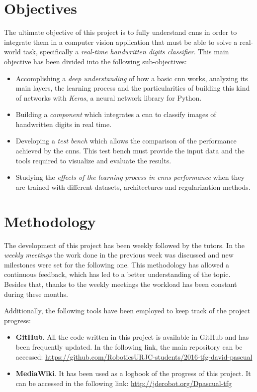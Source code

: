 \section{Objectives}\label{sec:objectives}
The ultimate objective of this project is to fully understand \glspl{cnn} in order to integrate them in a computer vision application that must be able to solve a real-world task, specifically a \emph{real-time handwritten digits classifier}. This main objective has been divided into the following sub-objectives: 
\begin{itemize}
	\item Accomplishing a \emph{deep understanding} of how a basic \gls{cnn} works, analyzing its main layers, the learning process and the particularities of building this kind of networks with \emph{Keras}, a neural network library for Python.
	\item Building a \emph{component} which integrates a \gls{cnn} to classify images of handwritten digits in real time.
	\item Developing a \emph{test bench} which allows the comparison of the performance achieved by the \glspl{cnn}. This test bench must provide the input data and the tools required to visualize and evaluate the results.
	\item Studying the \emph{effects of the learning process in \glspl{cnn} performance} when they are trained with different datasets, architectures and regularization methods.
\end{itemize}

\section{Methodology}
The development of this project has been weekly followed by the tutors. In the \emph{weekly meetings} the work done in the previous week was discussed and new milestones were set for the following one. This methodology has allowed a continuous feedback, which has led to a better understanding of the topic. Besides that, thanks to the weekly meetings the workload has been constant during these months. 

Additionally, the following tools have been employed to keep track of the project progress:
\begin{itemize}
	\item \textbf{GitHub}. All the code written in this project is available in GitHub and has been  frequently updated. In the following link, the main repository can be accessed:
	\url{https://github.com/RoboticsURJC-students/2016-tfg-david-pascual}
	\item \textbf{MediaWiki}. It has been used as a logbook of the progress of this project. It can be accessed in the following link:
	\url{http://jderobot.org/Dpascual-tfg}
\end{itemize}

